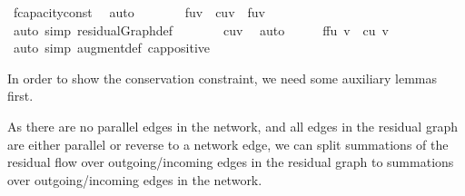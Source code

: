 \begin{isabellebody}
{\ f{\isacharprime}{\isachardot}capacity{\isacharunderscore}const\ \isamarkupfalse%
\ auto\isanewline
\ \ \isamarkupfalse%
\ \isamarkupfalse%
\ {\isachardoublequoteopen}{\isasymdots}\ {\isacharequal}\ f{\isacharparenleft}u{\isacharcomma}v{\isacharparenright}\ {\isacharplus}\ c{\isacharparenleft}u{\isacharcomma}v{\isacharparenright}\ {\isacharminus}\ f{\isacharparenleft}u{\isacharcomma}v{\isacharparenright}{\isachardoublequoteclose}\ \isanewline
\ \ \ \ \isamarkupfalse%
\ {\isacharparenleft}auto\ simp{\isacharcolon}\ residualGraph{\isacharunderscore}def{\isacharparenright}\isanewline
\ \ \isamarkupfalse%
\ \isamarkupfalse%
\ {\isachardoublequoteopen}{\isasymdots}\ {\isacharequal}\ c{\isacharparenleft}u{\isacharcomma}v{\isacharparenright}{\isachardoublequoteclose}\ \isamarkupfalse%
\ auto\isanewline
\ \ \isamarkupfalse%
\ \isamarkupfalse%
\ {\isachardoublequoteopen}{\isacharparenleft}f{\isasymup}f{\isacharprime}{\isacharparenright}{\isacharparenleft}u{\isacharcomma}\ v{\isacharparenright}\ {\isasymle}\ c{\isacharparenleft}u{\isacharcomma}\ v{\isacharparenright}{\isachardoublequoteclose}\ \isacommand{{\isachardot}}\isamarkupfalse%
\isanewline
{}\isamarkupfalse%
\ {\isacharparenleft}auto\ simp{\isacharcolon}\ augment{\isacharunderscore}def\ cap{\isacharunderscore}positive{\isacharparenright}%
\endisatagproof
{\isafoldproof}%
%
\isadelimproof
%
\endisadelimproof
%
}%
%
\isamarkuptrue%
%
\begin{isamarkuptext}%
In order to show the conservation constraint, we need some 
  auxiliary lemmas first.%
\end{isamarkuptext}\isamarkuptrue%
%
\begin{isamarkuptext}%
As there are no parallel edges in the network, and all edges 
  in the residual graph are either parallel or reverse to a network edge,
  we can split summations of the residual flow over outgoing/incoming edges in the 
  residual graph to summations over outgoing/incoming edges in the network.


\end{isamarkuptext}
\end{isabellebody}
